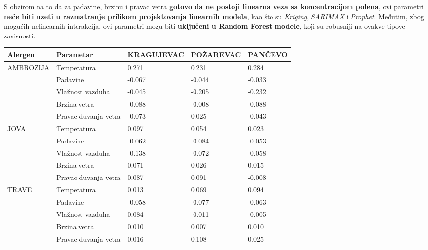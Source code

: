 \documentclass[12pt]{article}
\begin{document}
S obzirom na to da za padavine, brzinu i pravac vetra \textbf{gotovo da ne postoji linearna veza sa koncentracijom polena}, ovi parametri \textbf{neće biti uzeti u razmatranje prilikom projektovanja linearnih modela}, kao što su \textit{Kriging}, \textit{SARIMAX} i \textit{Prophet}. Međutim, zbog mogućih nelinearnih interakcija, ovi parametri mogu biti \textbf{uključeni u Random Forest modele}, koji su robusniji na ovakve tipove zavisnosti.

\begin{table}[!ht]
    \centering
    \begin{tabular}{|l|l|l|l|l|}
    \hline
        Alergen & Parametar & KRAGUJEVAC & POŽAREVAC & PANČEVO \\ \hline
        \multirow{2}{*}{AMBROZIJA}
        & Temperatura & 0.271 & 0.231 & 0.284 \\ \cline{2-5}
        & Padavine & -0.067 & -0.044 & -0.033 \\ \cline{2-5}
        & Vlažnost vazduha & -0.045 & -0.205 & -0.232 \\ \cline{2-5}
        & Brzina vetra & -0.088 & -0.008 & -0.088 \\ \cline{2-5}
        & Pravac duvanja vetra  & -0.073 & 0.025 & -0.043 \\ \hline
        \multirow{2}{*}{JOVA}
        & Temperatura & 0.097 & 0.054 & 0.023 \\ \cline{2-5}
        & Padavine & -0.062 & -0.084 & -0.053 \\ \cline{2-5}
        & Vlažnost vazduha & -0.138 & -0.072 & -0.058 \\ \cline{2-5}
        & Brzina vetra & 0.071 & 0.026 & 0.015 \\ \cline{2-5}
        & Pravac duvanja vetra  & 0.087 & 0.091 & -0.008 \\ \hline
        \multirow{2}{*}{TRAVE}
        & Temperatura & 0.013 & 0.069 & 0.094 \\ \cline{2-5}
        & Padavine & -0.058 & -0.077 & -0.063 \\ \cline{2-5}
        & Vlažnost vazduha & 0.084 & -0.011 & -0.005 \\ \cline{2-5}
        & Brzina vetra & 0.010 & 0.007 & 0.010 \\ \cline{2-5}
        & Pravac duvanja vetra  & 0.016 & 0.108 & 0.025 \\ \hline
    \end{tabular}
\end{table}
\end{document}
